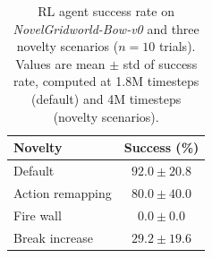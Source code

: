 \begin{table}[!tb]
\begin{center}
\renewcommand{\arraystretch}{1.15}
\begin{tabular}{lc}
 \toprule
 \textbf{Novelty} & \textbf{Success (\%)} \\
 \midrule
 Default          & $92.0 \pm 20.8$ \\
 Action remapping & $80.0 \pm 40.0$ \\
 Fire wall        & $0.0  \pm 0.0$  \\
 Break increase   & $29.2 \pm 19.6$ \\
 \bottomrule
\end{tabular}
\caption{RL agent success rate on \emph{NovelGridworld-Bow-v0} and three novelty scenarios ($n=10$ trials). Values are mean $\pm$ std of success rate, computed at 1.8M timesteps (default) and 4M timesteps (novelty scenarios).}
\label{tab:results_rl}
\end{center}
\end{table}